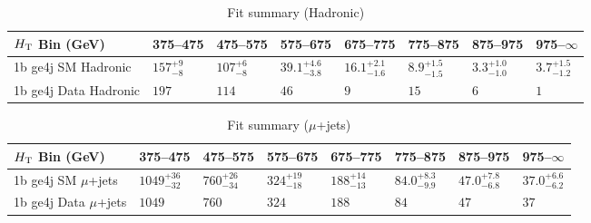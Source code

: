 \documentclass[8pt]{article}
\def\scalht{\mbox{$H_{\rm{T}}$}\xspace}
\newcommand\T{\rule{0pt}{2.6ex}}
\begin{document}
\begin{table}[ht!]
\caption{Fit summary (Hadronic)}
\label{tab:ensemble-summary}
\centering
\begin{tabular}{ llllllll }

\hline
\scalht Bin (GeV)       & 375--475                       & 475--575                       & 575--675                       & 675--775                       & 775--875                       & 875--975                       & 975--$\infty$                  \\ [1.000000ex]
\hline
1b ge4j SM Hadronic\T   & $157^{+9}_{-8}$                & $107^{+6}_{-8}$                & $39.1^{+4.6}_{-3.8}$           & $16.1^{+2.1}_{-1.6}$           & $8.9^{+1.5}_{-1.5}$            & $3.3^{+1.0}_{-1.0}$            & $3.7^{+1.5}_{-1.2}$            \\ 
1b ge4j Data Hadronic\T & $197$                          & $114$                          & $46$                           & $9$                            & $15$                           & $6$                            & $1$                            \\ 
\hline

\end{tabular}
\end{table}
\begin{table}[ht!]
\caption{Fit summary ($\mu$+jets)}
\label{tab:ensemble-summary}
\centering
\begin{tabular}{ llllllll }

\hline
\scalht Bin (GeV)       & 375--475                       & 475--575                       & 575--675                       & 675--775                       & 775--875                       & 875--975                       & 975--$\infty$                  \\ [1.000000ex]
\hline
1b ge4j SM $\mu$+jets\T & $1049^{+36}_{-32}$             & $760^{+26}_{-34}$              & $324^{+19}_{-18}$              & $188^{+14}_{-13}$              & $84.0^{+8.3}_{-9.9}$           & $47.0^{+7.8}_{-6.8}$           & $37.0^{+6.6}_{-6.2}$           \\ 
1b ge4j Data $\mu$+jets\T & $1049$                         & $760$                          & $324$                          & $188$                          & $84$                           & $47$                           & $37$                           \\ 
\hline

\end{tabular}
\end{table}
\end{document}
